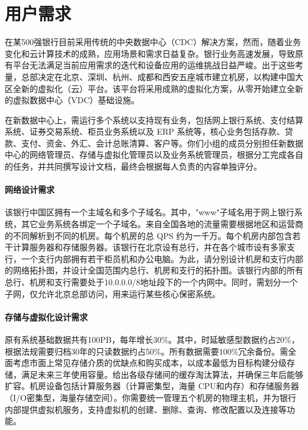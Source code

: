 \documentclass[UTF8]{ctexart} %
\providecommand{\keywords}[1]{{\textit{关键词: }} #1}
\begin{document}
\newpage

\begin{abstract}                                %
    \begin{spacing}{1.5}

        此处放置你的摘要

        \keywords{关键词1,关键词2,关键词3}
    \end{spacing}
\end{abstract}
\newpage
\tableofcontents
\newpage

\section{用户需求}

在某500强银行目前采用传统的中央数据中心（CDC）解决方案，然而，随着业务变化和云计算技术的成熟，应用场景和需求日益复杂。银行业务高速发展，导致原有平台无法满足当前应用需求的迭代和设备应用的运维挑战日益严峻。出于这些考量，总部决定在北京、深圳、杭州、成都和西安五座城市建立机房，以构建中国大区全新的虚拟化（云）平台。该平台将采用成熟的虚拟化方案，从零开始建立全新的虚拟数据中心（VDC）基础设施。

在新数据中心上，需运行多个系统以支持现有业务，包括网上银行系统、支付结算系统、证券交易系统、柜员业务系统以及 ERP 系统等，核心业务包括存款、贷款、支付、资金、外汇、会计总账清算、客户等。你们小组的成员分别担任新数据中心的网络管理员、存储与虚拟化管理员以及业务系统管理员，根据分工完成各自的任务，并共同撰写设计文档，最终会根据每人负责的内容单独评分。

\paragraph{网络设计需求} 该银行中国区拥有一个主域名和多个子域名。其中，"www"子域名用于网上银行系统，其它业务系统各绑定一个子域名。来自全国各地的流量需要根据地区和运营商的不同解析到不同的机房。每个机房的总 QPS 约为一千万。每个机房内部包含若干计算服务器和存储服务器。该银行在北京设有总行，并在各个城市设有多家支行，一个支行内部拥有若干柜员机和办公电脑。为此，请分别设计机房和支行内部的网络拓扑图，并设计全国范围内总行、机房和支行的拓扑图。该银行内部的所有总行、机房和支行需要处于10.0.0.0/8地址段下的一个内网中。同时，需划分一个子网，仅允许北京总部访问，用来运行某些核心保密系统。

\paragraph{存储与虚拟化设计需求} 原有系统基础数据共有100PB，每年增长30\%。其中，时延敏感型数据约占20\%，根据法规需要归档30年的只读数据约占50\%。所有数据需要100\%冗余备份。需全面考虑市面上常见存储介质的优缺点和购买成本，以成本最低为目标构建分级存储，满足未来三年使用容量。给出各级存储间的缓存淘汰算法，并确保三年后能够扩容。机房设备包括计算服务器（计算密集型，海量 CPU和内存）和存储服务器（I/O密集型，海量存储空间）。你需要统一管理五个机房的物理主机，并为银行内部提供虚拟机服务，支持虚拟机的创建、删除、查询、修改配置以及连接等功能。
\end{document}
